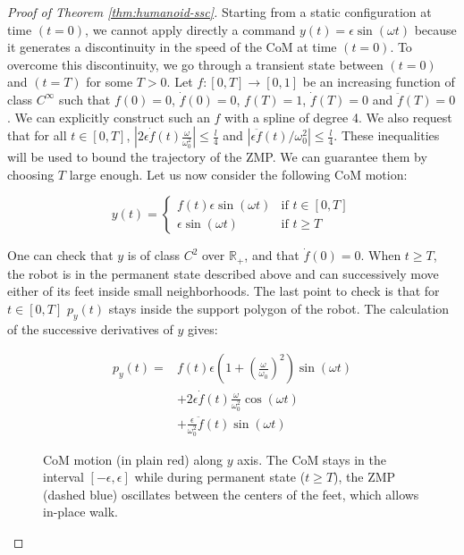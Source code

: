 \documentclass{article}
\begin{document}
\begin{proof}[Proof of Theorem \ref{thm:humanoid-ssc}]
Starting from a static configuration at time $(t=0)$, we cannot apply
directly  a  command  $y(t)  =  \epsilon \sin(\omega  t)$  because  it
generates  a discontinuity  in the  speed of  the CoM  at time $(t=0)$. To
overcome this  discontinuity, we go through a  transient state between
$(t=0)$ and  $(t=T)$ for some  $T >0$. Let  $f:[0,T] \rightarrow
[0,1]$  be an  increasing function of class $C^\infty$  such  that  $f(0)  =  0$,
$\dot{f}(0) = 0$, $f(T) =  1$, $\dot{f}(T) = 0$ and $\ddot{f}(T)
=  0$.  We can explicitly  construct  such  an $f$   with  a
spline of degree  4.   We   also   request   that   for  all   $t   \in   [0,T]$,
$|2\epsilon\dot{f}(t)\frac{\omega}{\omega_0^2}|   \leq  \frac{l}{4}$
and   $|\epsilon\ddot{f}(t)/\omega_0^2|  \leq   \frac{l}{4}$.  These
inequalities  will be  used  to bound  the  trajectory of  the  ZMP. We  can
guarantee them by  choosing $T$ large enough. Let  us now consider the
following CoM motion:

\[
y(t) = \left\{
\begin{array}{ll}
f(t)\epsilon\sin(\omega t) 
& \text{if } t\in [0,T]
\\ 
\epsilon\sin(\omega t) 
& \text{if } t \geq T \end{array}
\right.
\]

One can  check that $y$  is of class $C^2$ over  $\mathbb{R}_+$, and
that $\dot{f}(0) = 0$. When $t\geq T$, the robot is in the permanent
state described above  and can successively move either of its 
feet  inside small neighborhoods.
The  last point to check
is that for $t \in  [0,T]$ $p_y(t)$ stays inside the support polygon
of the robot. The calculation of the successive derivatives of $y$ gives:

\[
\begin{array}{cl}
p_y(t) = &  f(t) \epsilon (1 + \left(\frac{\omega}{\omega_0}\right)^2)
\sin (\omega  t) \\ &  + 2\epsilon \dot{f}(t)\frac{\omega}{\omega_0^2}
\cos  (\omega t)  \\ &  +  \frac{\epsilon}{\omega_0^2}\ddot{f}(t) \sin
(\omega t)
\end{array}
\]



\begin{figure}
\centering


\caption{CoM motion (in plain red) along $y$ axis.  The CoM stays in the interval
  $[-\epsilon,\epsilon]$ while during  permanent state ($t \geq T$),
  the ZMP (dashed blue) oscillates between the centers of the feet, which allows
  in-place walk.}
\label{fig:zmp-inplace}
\end{figure}


\end{proof}
\end{document}

